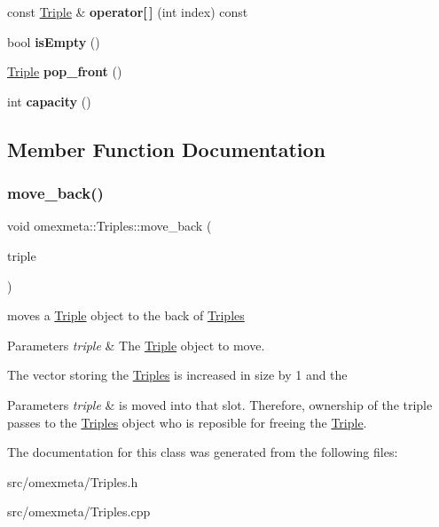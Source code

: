 \begin{DoxyCompactItemize}
const \hyperlink{classomexmeta_1_1Triple}{Triple} \& {\bfseries operator\mbox{[}$\,$\mbox{]}} (int index) const
\item 
\mbox{\label{classomexmeta_1_1Triples_a48ab93d0e38e3cfcb4eac9264b047f0a}} 
bool {\bfseries is\+Empty} ()
\item 
\mbox{\label{classomexmeta_1_1Triples_abb333b83c7a8ed1f210816ef88c8d3a0}} 
\hyperlink{classomexmeta_1_1Triple}{Triple} {\bfseries pop\+\_\+front} ()
\item 
\mbox{\label{classomexmeta_1_1Triples_a1f7ba9d5cd575ba5c63ed9dbbd1f279c}} 
int {\bfseries capacity} ()
\end{DoxyCompactItemize}


\subsection{Member Function Documentation}
\mbox{\label{classomexmeta_1_1Triples_a88dcf4b950f105acb621bd07f07a38a0}} 
\subsubsection{\texorpdfstring{move\+\_\+back()}{move\_back()}}
{\footnotesize\ttfamily void omexmeta\+::\+Triples\+::move\+\_\+back (\begin{DoxyParamCaption}\item[{\hyperlink{classomexmeta_1_1Triple}{Triple} \&}]{triple }\end{DoxyParamCaption})}



moves a \hyperlink{classomexmeta_1_1Triple}{Triple} object to the back of \hyperlink{classomexmeta_1_1Triples}{Triples} 


\begin{DoxyParams}{Parameters}
{\em triple} & The \hyperlink{classomexmeta_1_1Triple}{Triple} object to move.\\
\hline
\end{DoxyParams}
The vector storing the \hyperlink{classomexmeta_1_1Triples}{Triples} is increased in size by 1 and the 
\begin{DoxyParams}{Parameters}
{\em triple} & is moved into that slot. Therefore, ownership of the triple passes to the \hyperlink{classomexmeta_1_1Triples}{Triples} object who is reposible for freeing the \hyperlink{classomexmeta_1_1Triple}{Triple}. \\
\hline
\end{DoxyParams}


The documentation for this class was generated from the following files\+:\begin{DoxyCompactItemize}
\item 
src/omexmeta/Triples.\+h\item 
src/omexmeta/Triples.\+cpp\end{DoxyCompactItemize}
